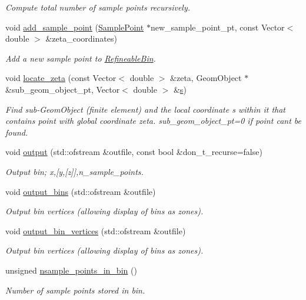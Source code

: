 \begin{DoxyCompactItemize}
\begin{DoxyCompactList}\small\item\em Compute total number of sample points recursively. \end{DoxyCompactList}\item 
void \hyperlink{classRefineableBin_a55737725c556d80d6695549550b52df5}{add\+\_\+sample\+\_\+point} (\hyperlink{classSamplePoint}{Sample\+Point} $\ast$new\+\_\+sample\+\_\+point\+\_\+pt, const Vector$<$ double $>$ \&zeta\+\_\+coordinates)
\begin{DoxyCompactList}\small\item\em Add a new sample point to \hyperlink{classRefineableBin}{Refineable\+Bin}. \end{DoxyCompactList}\item 
void \hyperlink{classRefineableBin_a92d871f784877d48ae46d363419b5e52}{locate\+\_\+zeta} (const Vector$<$ double $>$ \&zeta, Geom\+Object $\ast$\&sub\+\_\+geom\+\_\+object\+\_\+pt, Vector$<$ double $>$ \&\hyperlink{cfortran_8h_ab7123126e4885ef647dd9c6e3807a21c}{s})
\begin{DoxyCompactList}\small\item\em Find sub-\/\+Geom\+Object (finite element) and the local coordinate s within it that contains point with global coordinate zeta. sub\+\_\+geom\+\_\+object\+\_\+pt=0 if point can\textquotesingle{}t be found. \end{DoxyCompactList}\item 
void \hyperlink{classRefineableBin_a52d935cc69527220005ecee7cfb2b5e8}{output} (std\+::ofstream \&outfile, const bool \&don\+\_\+t\+\_\+recurse=false)
\begin{DoxyCompactList}\small\item\em Output bin; x,\mbox{[}y,\mbox{[}z\mbox{]}\mbox{]},n\+\_\+sample\+\_\+points. \end{DoxyCompactList}\item 
void \hyperlink{classRefineableBin_a0c3428cc5e30d0a29c13e2ce8eb3076f}{output\+\_\+bins} (std\+::ofstream \&outfile)
\begin{DoxyCompactList}\small\item\em Output bin vertices (allowing display of bins as zones). \end{DoxyCompactList}\item 
void \hyperlink{classRefineableBin_a71ceb55788e4d4f39986c138349a22f7}{output\+\_\+bin\+\_\+vertices} (std\+::ofstream \&outfile)
\begin{DoxyCompactList}\small\item\em Output bin vertices (allowing display of bins as zones). \end{DoxyCompactList}\item 
unsigned \hyperlink{classRefineableBin_a377f1b457facf99566aab772af7260db}{nsample\+\_\+points\+\_\+in\+\_\+bin} ()
\begin{DoxyCompactList}\small\item\em Number of sample points stored in bin. \end{DoxyCompactList}\end{DoxyCompactItemize}
